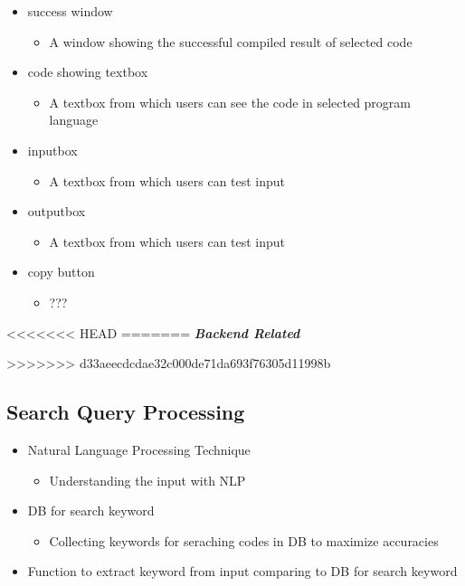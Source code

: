 \documentclass[conference]{IEEEtran}
\begin{document}
\begin{itemize}
\begin{itemize}
\begin{itemize}
\begin{itemize}
  \item success window
  \begin{itemize}
    \item A window showing the successful compiled result of selected code
  \end{itemize}
  \item code showing textbox
  \begin{itemize}
    \item A textbox from which users can see the code in selected program language
  \end{itemize}
  \item inputbox
  \begin{itemize}
    \item A textbox from which users can test input
  \end{itemize}
  \item outputbox
  \begin{itemize}
    \item A textbox from which users can test input
  \end{itemize}
  \item copy button
  \begin{itemize}
    \item ???
  \end{itemize}
\end{itemize}
\textit{ }


<<<<<<< HEAD
=======
\textit{\textbf{Backend Related}}
\textit{ }

>>>>>>> d33aeecdcdae32c000de71da693f76305d11998b
\subsection{Search Query Processing}
\begin{itemize}
  \item Natural Language Processing Technique
  \begin{itemize}
    \item Understanding the input with NLP
  \end{itemize}
  \item DB for search keyword
  \begin{itemize}
    \item Collecting keywords for seraching codes in DB to maximize accuracies
  \end{itemize}
  \item Function to extract keyword from input comparing to DB for search keyword
\end{itemize}
\textit{ }



\end{itemize}
\end{itemize}
\end{itemize}
\end{document}
